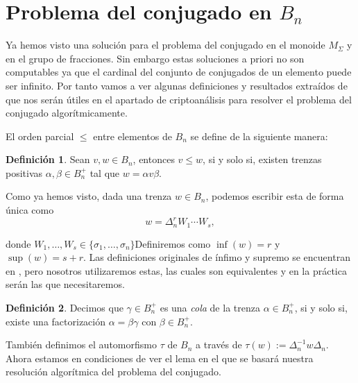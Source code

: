 \documentclass[12pt]{book}
\theoremstyle{definition}
\newtheorem{defi}{Definición}[section]
\begin{document}
\section{Problema del conjugado en $B_n$}

Ya hemos visto una solución para el problema del conjugado en el monoide $M_\Sigma$ y en el grupo de fracciones. Sin embargo estas soluciones a priori no son computables ya que el cardinal del conjunto de conjugados de un elemento puede ser infinito. Por tanto vamos a ver algunas definiciones y resultados extraídos de \cite{Att} que nos serán útiles en el apartado de criptoanálisis para resolver el problema del conjugado algorítmicamente.

El orden parcial $\leq$ entre elementos de $B_n$ se define de la siguiente manera:

\begin{defi}
Sean $v,w\in B_n$, entonces $v\leq w$, si y solo si, existen trenzas positivas $\alpha,\beta\in B_n^{+}$ tal que $w = \alpha v\beta$.
\end{defi}

Como ya hemos visto, dada una trenza $w\in B_n$, podemos escribir esta de forma única como
$$w = \Delta_n^r W_1\cdots W_s,$$

donde $W_1,\ldots,W_s\in\{\sigma_1,\ldots,\sigma_n\}$Definiremos como $\inf(w) = r$ y $\sup(w)=s+r$. Las definiciones originales de ínfimo y supremo se encuentran en \cite{Alg}, pero nosotros utilizaremos estas, las cuales son equivalentes y en la práctica serán las que necesitaremos.

\begin{defi}
Decimos que $\gamma\in B_n^+$ es una \textit{cola} de la trenza $\alpha\in B_n^+$, si y solo si, existe una factorización $\alpha = \beta\gamma$ con $\beta\in B_n^+$.
\end{defi}

También definimos el automorfismo $\tau$ de $B_n$ a través de $\tau(w):=\Delta_n^{-1}w\Delta_n$. Ahora estamos en condiciones de ver el lema en el que se basará nuestra resolución algorítmica del problema del conjugado.
\end{document}
